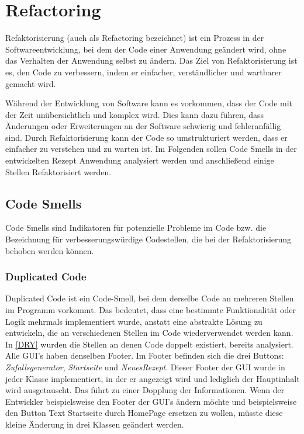 \chapter{Refactoring}
Refaktorisierung (auch als Refactoring bezeichnet) ist ein Prozess in der Softwareentwicklung, bei dem der Code einer Anwendung geändert wird, ohne das Verhalten der Anwendung selbst zu ändern. Das Ziel von Refaktorisierung ist es, den Code zu verbessern, indem er einfacher, verständlicher und wartbarer gemacht wird.

Während der Entwicklung von Software kann es vorkommen, dass der Code mit der Zeit unübersichtlich und komplex wird. Dies kann dazu führen, dass Änderungen oder Erweiterungen an der Software schwierig und fehleranfällig sind. Durch Refaktorisierung kann der Code so umstrukturiert werden, dass er einfacher zu verstehen und zu warten ist. Im Folgenden sollen Code Smells in der entwickelten Rezept Anwendung analysiert werden und anschließend einige Stellen Refaktorisiert werden. 
\section{Code Smells}
Code Smells sind Indikatoren für potenzielle Probleme im Code bzw. die Bezeichnung für verbesserungswürdige Codestellen, die bei der Refaktorisierung behoben werden können. 
\subsection{Duplicated Code}
Duplicated Code ist ein Code-Smell, bei dem derselbe Code an mehreren Stellen im Programm vorkommt. Das bedeutet, dass eine bestimmte Funktionalität oder Logik mehrmals implementiert wurde, anstatt eine abstrakte Lösung zu entwickeln, die an verschiedenen Stellen im Code wiederverwendet werden kann. In \autoref{DRY} wurden die Stellen an denen Code doppelt existiert, bereits analysiert. Alle GUI's haben denselben Footer. Im Footer befinden sich die drei Buttons: \emph{Zufallsgenerator}, \emph{Startseite} und \emph{NeuesRezept}. Dieser Footer der GUI wurde in jeder Klasse implementiert, in der er angezeigt wird und lediglich der Hauptinhalt wird ausgetauscht. Das führt zu einer Dopplung der Informationen. Wenn der Entwickler beispielsweise den Footer der GUI's ändern möchte und beispielsweise den Button Text Startseite durch HomePage ersetzen zu wollen, müsste diese kleine Änderung in drei Klassen geändert werden. 

